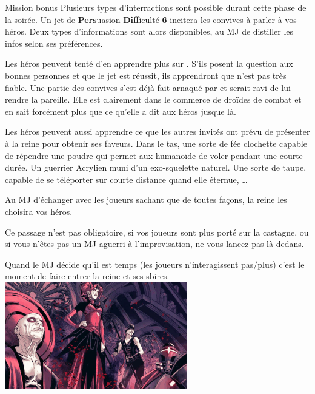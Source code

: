 \begin{paperbox}{Mission bonus}
Plusieurs types d’interractions sont possible durant cette phase de la soirée. Un jet de \textbf{Pers}uasion \textbf{Diff}iculté \textbf{6} incitera les convives à parler à vos héros. Deux types d’informations sont alors disponibles, au MJ de distiller les infos selon ses préférences.

Les héros peuvent tenté d’en apprendre plus sur . S’ils posent la question aux bonnes personnes et que le jet est réussit, ils apprendront que  n’est pas très fiable. Une partie des convives s’est déjà fait arnaqué par  et serait ravi de lui rendre la pareille. Elle est clairement dans le commerce de droïdes de combat et en sait forcément plus que ce qu’elle a dit aux héros jusque là.

Les héros peuvent aussi apprendre ce que les autres invités ont prévu de présenter à la reine pour obtenir ses faveurs. Dans le tas, une sorte de fée clochette capable de répendre une poudre qui permet aux humanoïde de voler pendant une courte durée. Un guerrier Acrylien muni d’un exo-squelette naturel. Une sorte de taupe, capable de se téléporter sur courte distance quand elle éternue, \dots

Au MJ d’échanger avec les joueurs sachant que de toutes façons, la reine les choisira vos héros. 

Ce passage n’est pas obligatoire, si vos joueurs sont plus porté sur la castagne, ou si vous n’êtes pas un MJ aguerri à l’improvisation, ne vous lancez pas là dedans.
\end{paperbox}

Quand le MJ décide qu’il est temps (les joueurs n’interagissent pas/plus) c’est le moment de faire entrer la reine et ses sbires.\\

\noindent\includegraphics[width=\linewidth]{_img/places/queen-with-minions.png}

